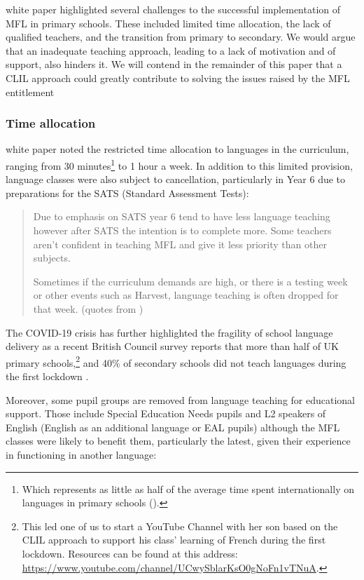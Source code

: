 \documentclass[output=paper]{langscibook}
\begin{document}
 white paper highlighted several challenges to the successful implementation of MFL in primary schools. These included limited time allocation, the lack of qualified teachers, and the transition from primary to secondary. We would argue that an inadequate teaching approach, leading to a lack of motivation and of support, also hinders it. We will contend in the remainder of this paper that a CLIL approach could greatly contribute to solving the issues raised by the MFL entitlement

\subsubsection{Time allocation}

 white paper noted the restricted time allocation to languages in the curriculum, ranging from 30 minutes\footnote{Which represents as little as half of the average time spent internationally on languages in primary schools (\citealt{OECD2014}).} to 1 hour a week. In addition to this limited provision, language classes were also subject to cancellation, particularly in Year 6 due to preparations for the SATS (Standard Assessment Tests):

\begin{quote}
Due to emphasis on SATS year 6 tend to have less language teaching however after SATS the intention is to complete more. Some teachers aren’t confident in teaching MFL and give it less priority than other subjects.

Sometimes if the curriculum demands are high, or there is a testing week or other events such as Harvest, language teaching is often dropped for that week. (quotes from \citealt[9]{Collen2021})
\end{quote}

The COVID-19 crisis has further highlighted the fragility of school language delivery as a recent British Council survey reports that more than half of UK primary schools,\footnote{This led one of us to start a YouTube Channel with her son based on the CLIL approach to support his class’ learning of French during the first lockdown. Resources can be found at this address: \url{https://www.youtube.com/channel/UCwySblarKsO0gNoFn1vTNuA}.}  and 40\% of secondary schools did not teach languages during the first lockdown \citep{Bawden2021}. 

Moreover, some pupil groups are removed from language teaching for educational support. Those include Special Education Needs pupils and L2 speakers of English (English as an additional language or EAL pupils) although the MFL classes were likely to benefit them, particularly the latest, given their experience in functioning in another language:
\end{document}
